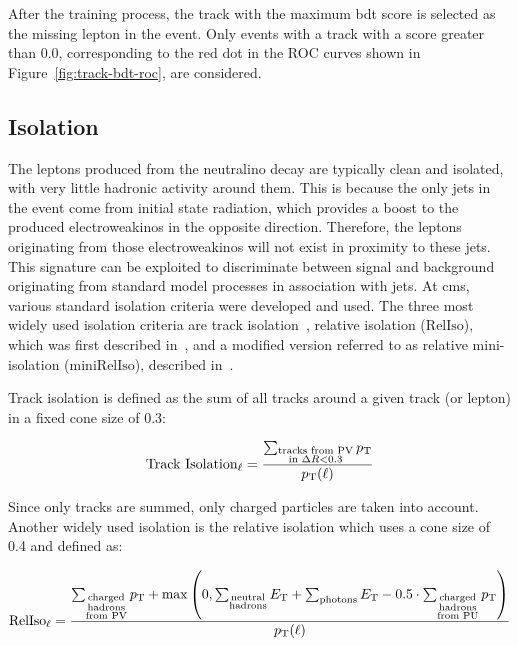 After the training process, the track with the maximum \gls{bdt} score is selected as the missing lepton in the event. Only events with a track with a score greater than 0.0, corresponding to the red dot in the ROC curves shown in Figure~\ref{fig:track-bdt-roc}, are considered.

\clearpage
\subsection{Isolation}
\label{sec:isolation}

The leptons produced from the neutralino decay \neuttdecay are typically clean and isolated, with very little hadronic activity around them. This is because the only jets in the event come from initial state radiation, which provides a boost to the produced electroweakinos in the opposite direction. Therefore, the leptons originating from those electroweakinos will not exist in proximity to these jets. This signature can be exploited to discriminate between signal and background originating from standard model processes in association with jets. At \gls{cms}, various standard isolation criteria were developed and used. The three most widely used isolation criteria are track isolation~\cite{muon-pog-recommendations}, relative isolation ($\mathrm{RelIso}$), which was first described in~\cite{Chatrchyan_2011}, and a modified version referred to as relative mini-isolation ($\mathrm{miniRelIso}$), described in~\cite{Rehermann_2011}.

Track isolation is defined as the \pt sum of all tracks around a given track (or lepton) in a fixed cone size of 0.3:

\begin{equation}
\text{Track Isolation}_\ell = \frac{ \sum_{\substack{\text{tracks from PV}\\ \text{in } \Delta R<0.3}}p_{\mathrm{T}}}{ p_{\mathrm{T}}(\ell) } 
\end{equation}

Since only tracks are summed, only charged particles are taken into account. Another widely used isolation is the relative isolation which uses a cone size of 0.4 and defined as:

\begin{equation}
\text{RelIso}_\ell = \frac{ \sum_{\substack{\text{charged}\\\text{hadrons}\\\text{from PV}}}p_{\mathrm{T}} + \max\left(0, \sum_{\substack{\text{neutral}\\\text{hadrons}}}E_{\mathrm{T}} + \sum_{\text{photons}}E_{\mathrm{T}} - 0.5\cdot \sum_{\substack{\text{charged}\\\text{hadrons}\\\text{from PU}}}p_{\mathrm{T}} \right) }{ p_{\mathrm{T}}(\ell) }
\end{equation}

